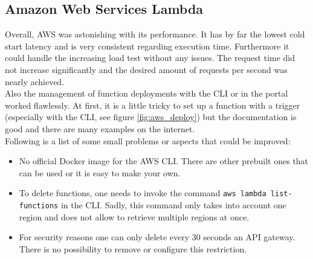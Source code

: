\subsection*{Amazon Web Services Lambda}
Overall, \gls{AWS} was astonishing with its performance. It has by far the lowest cold start latency and is very consistent regarding execution time. Furthermore it could handle the increasing load test without any issues. The request time did not increase significantly and the desired amount of requests per second was nearly achieved.\\
Also the management of function deployments with the \gls{CLI} or in the portal worked flawlessly. At first, it is a little tricky to set up a function with a trigger (especially with the \gls{CLI}, see figure \ref{fig:aws_deploy}) but the documentation is good and there are many examples on the internet.\\
Following is a list of some small problems or aspects that could be improved:
\begin{itemize}
    \item No official Docker image for the \gls{AWS} \gls{CLI}. There are other prebuilt ones that can be used or it is easy to make your own.
    \item To delete functions, one needs to invoke the command \texttt{aws lambda list-functions} in the \gls{CLI}. Sadly, this command only takes into account one region and does not allow to retrieve multiple regions at once.
    \item For security reasons one can only delete every 30 seconds an \gls{API} gateway. There is no possibility to remove or configure this restriction.
\end{itemize}
